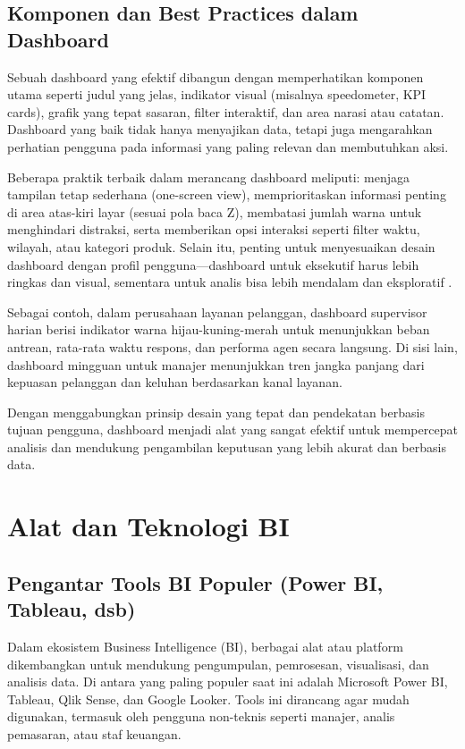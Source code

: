 \subsection{Komponen dan Best Practices dalam Dashboard}

Sebuah dashboard yang efektif dibangun dengan memperhatikan komponen utama seperti judul yang jelas, indikator visual (misalnya speedometer, KPI cards), grafik yang tepat sasaran, filter interaktif, dan area narasi atau catatan. Dashboard yang baik tidak hanya menyajikan data, tetapi juga mengarahkan perhatian pengguna pada informasi yang paling relevan dan membutuhkan aksi.

Beberapa praktik terbaik dalam merancang dashboard meliputi: menjaga tampilan tetap sederhana (one-screen view), memprioritaskan informasi penting di area atas-kiri layar (sesuai pola baca Z), membatasi jumlah warna untuk menghindari distraksi, serta memberikan opsi interaksi seperti filter waktu, wilayah, atau kategori produk. Selain itu, penting untuk menyesuaikan desain dashboard dengan profil pengguna—dashboard untuk eksekutif harus lebih ringkas dan visual, sementara untuk analis bisa lebih mendalam dan eksploratif \cite{koen2016interactive}.

Sebagai contoh, dalam perusahaan layanan pelanggan, dashboard supervisor harian berisi indikator warna hijau-kuning-merah untuk menunjukkan beban antrean, rata-rata waktu respons, dan performa agen secara langsung. Di sisi lain, dashboard mingguan untuk manajer menunjukkan tren jangka panjang dari kepuasan pelanggan dan keluhan berdasarkan kanal layanan.

Dengan menggabungkan prinsip desain yang tepat dan pendekatan berbasis tujuan pengguna, dashboard menjadi alat yang sangat efektif untuk mempercepat analisis dan mendukung pengambilan keputusan yang lebih akurat dan berbasis data.

\section{Alat dan Teknologi BI}
\subsection{Pengantar Tools BI Populer (Power BI, Tableau, dsb)}

Dalam ekosistem Business Intelligence (BI), berbagai alat atau platform dikembangkan untuk mendukung pengumpulan, pemrosesan, visualisasi, dan analisis data. Di antara yang paling populer saat ini adalah Microsoft Power BI, Tableau, Qlik Sense, dan Google Looker. Tools ini dirancang agar mudah digunakan, termasuk oleh pengguna non-teknis seperti manajer, analis pemasaran, atau staf keuangan.

